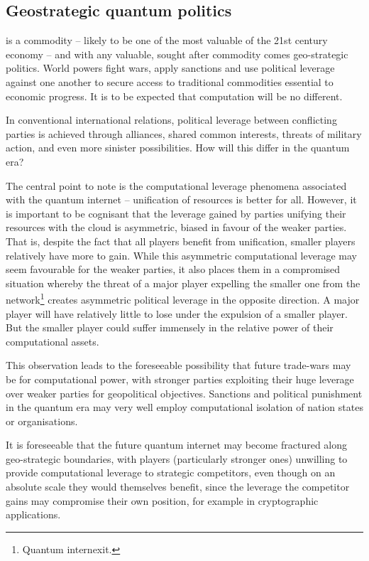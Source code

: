 \subsection{Geostrategic quantum politics}

 is a commodity -- likely to be one of the most valuable of the 21st century economy -- and with any valuable, sought after commodity comes geo-strategic politics. World powers fight wars, apply sanctions and use political leverage against one another to secure access to traditional commodities essential to economic progress. It is to be expected that computation will be no different.

In conventional international relations, political leverage between conflicting parties is achieved through alliances, shared common interests, threats of military action, and even more sinister possibilities. How will this differ in the quantum era?

The central point to note is the computational leverage phenomena associated with the quantum internet -- unification of resources is better for all. However, it is important to be cognisant that the leverage gained by parties unifying their resources with the cloud is asymmetric, biased in favour of the weaker parties. That is, despite the fact that all players benefit from unification, smaller players relatively have more to gain. While this asymmetric computational leverage may seem favourable for the weaker parties, it also places them in a compromised situation whereby the threat of a major player expelling the smaller one from the network\footnote{Quantum internexit.} creates asymmetric political leverage in the opposite direction. A major player will have relatively little to lose under the expulsion of a smaller player. But the smaller player could suffer immensely in the relative power of their computational assets.

This observation leads to the foreseeable possibility that future trade-wars may be for computational power, with stronger parties exploiting their huge leverage over weaker parties for geopolitical objectives. Sanctions and political punishment in the quantum era may very well employ computational isolation of nation states or organisations.

It is foreseeable that the future quantum internet may become fractured along geo-strategic boundaries, with players (particularly stronger ones) unwilling to provide computational leverage to strategic competitors, even though on an absolute scale they would themselves benefit, since the leverage the competitor gains may compromise their own position, for example in cryptographic applications.

